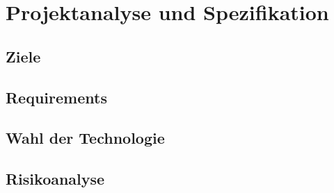 \chapter{Projektanalyse und Spezifikation}
\label{kap-projektanalyse}

\section{Ziele}


\section{Requirements}

\section{Wahl der Technologie}

\section{Risikoanalyse}



